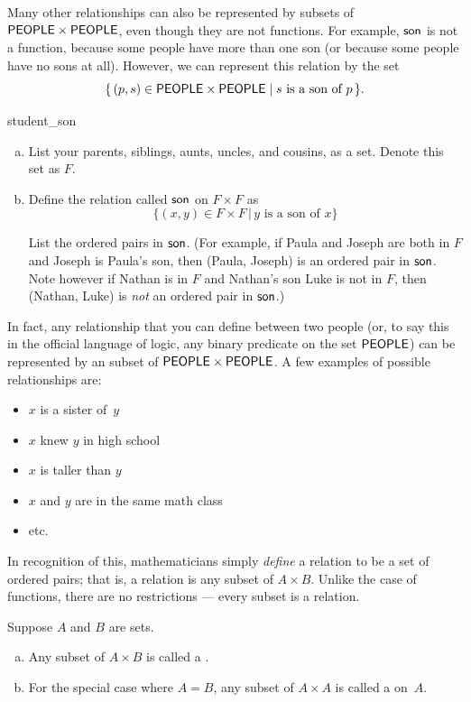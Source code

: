 Many other relationships can also be represented by subsets of $\sf{PEOPLE} \times \sf{PEOPLE}$, even though they are not functions. For example, $\sf{son}$ is not a function, because some people have more than one son (or because some people have no sons at all). However, we can represent this relation by the set
\[  \{\, (p,s) \in  {\sf{P}EOPLE} \times {\sf{P}EOPLE} \mid s \text{ is a son of } p \,\} .\]
	
\begin{exercise}{student_son}
\begin{enumerate}[(a)]
\item
List your parents, siblings, aunts, uncles, and cousins, as a set.  Denote this set as $F$.
\item
Define the relation called $\sf{son}$ on $F \times F$ as
\[
\{ (x,y) \in F \times F \,|\, y \text{ is a son of } x \} \]

\noindent
List the ordered pairs in $\sf{son}$. (For example, if Paula and Joseph are both in $F$ and Joseph is Paula's son, then (Paula, Joseph) is an ordered pair in $\sf{son}$.  Note however if Nathan is in $F$ and Nathan's son Luke is not in $F$, then (Nathan, Luke) is \emph{not} an ordered pair in $\sf{son}$.)
\end{enumerate}
\end{exercise}
	
In fact, any relationship that you can define between two people (or, to say this in the official language of logic, any binary predicate on the set $\sf{PEOPLE}$) can be represented by an subset of $\sf{PEOPLE} \times \sf{PEOPLE}$. A few examples of possible relationships are:
	\begin{itemize}
	\item $x$ is a sister of~$y$
	\item $x$ knew $y$ in high school
	\item $x$ is taller than $y$
	\item $x$ and $y$ are in the same math class
	\item etc.
	\end{itemize}
In recognition of this, mathematicians simply \emph{define} a relation to be a set of ordered pairs; that is, a relation is any subset of $A \times B$. Unlike the case of functions, there are no restrictions --- every subset is a relation.


\begin{defn} \label{relation}  Suppose $A$ and $B$ are sets. 
\begin{enumerate}[(a)]
\item Any subset of $A \times B$ is called a .
\item For the special case where $A = B$, any subset of $A \times A$ is called a   on~$A$.
\end{enumerate}
\end{defn}

